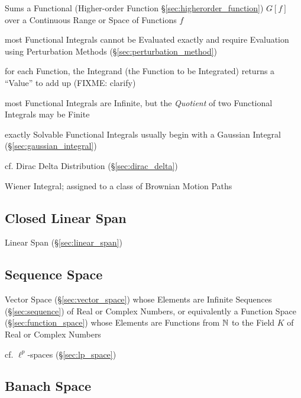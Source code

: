 Sums a Functional (Higher-order Function \S\ref{sec:higherorder_function})
$G[f]$ over a Continuous Range or Space of Functions $f$

most Functional Integrals cannot be Evaluated exactly and require Evaluation
using Perturbation Methods (\S\ref{sec:perturbation_method})

for each Function, the Integrand (the Function to be Integrated) returns a
``Value'' to add up (FIXME: clarify)

most Functional Integrals are Infinite, but the \emph{Quotient} of two
Functional Integrals may be Finite

exactly Solvable Functional Integrals usually begin with a Gaussian Integral
(\S\ref{sec:gaussian_integral})

cf. Dirac Delta Distribution (\S\ref{sec:dirac_delta})

Wiener Integral; assigned to a class of Brownian Motion Paths



\subsection{Closed Linear Span}\label{sec:closed_linear_span}

Linear Span (\S\ref{sec:linear_span})



\subsection{Sequence Space}\label{sec:sequence_space}

Vector Space (\S\ref{sec:vector_space}) whose Elements are Infinite Sequences
(\S\ref{sec:sequence}) of Real or Complex Numbers, or equivalently a Function
Space (\S\ref{sec:function_space}) whose Elements are Functions from $\mathbb{N}$ to
the Field $K$ of Real or Complex Numbers

\fist cf. $\ell^p$-spaces (\S\ref{sec:lp_space})



\subsection{Banach Space}\label{sec:banach_space}

